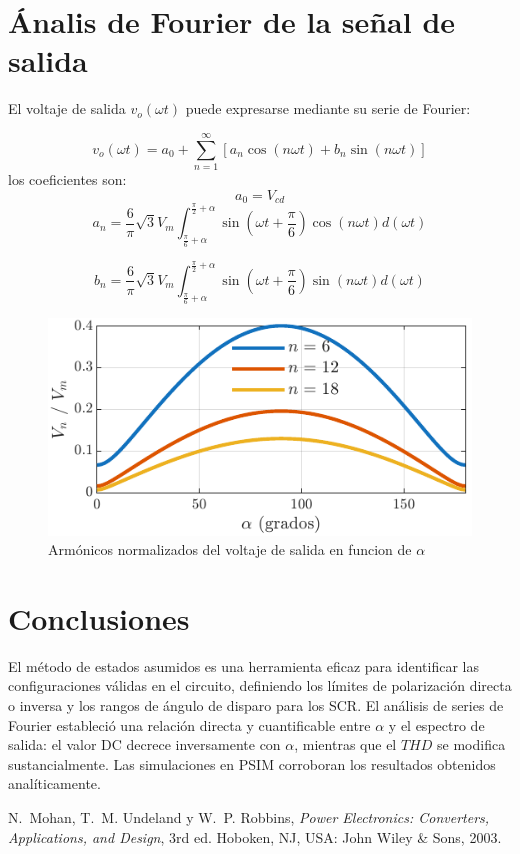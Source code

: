 \documentclass[conference]{IEEEtran}
\begin{document}
\section{Ánalis de Fourier de la señal de salida}
El voltaje de salida \(v_o(\omega t)\) puede expresarse mediante su serie de Fourier:

\[
v_o(\omega t) = a_0 + \sum_{n=1}^{\infty} \left[a_n \cos(n\omega t) + b_n \sin(n\omega t)\right]
\]
los coeficientes son:
\[
a_0 = V_{cd}
\]
\[
a_n = \frac{6}{\pi} \sqrt{3} V_m \int_{\frac{\pi}{6} + \alpha}^{\frac{\pi}{2} + \alpha} \sin\left(\omega t + \frac{\pi}{6}\right) \cos(n\omega t)  d(\omega t)
\]

\[
b_n = \frac{6}{\pi} \sqrt{3} V_m \int_{\frac{\pi}{6} + \alpha}^{\frac{\pi}{2} + \alpha} \sin\left(\omega t + \frac{\pi}{6}\right) \sin(n\omega t)  d(\omega t)
\]

\begin{figure}[ht]
	\centering
	\includegraphics[scale=1]{Fig/Armonicos.pdf}
	\caption{Armónicos normalizados del voltaje de salida en funcion de $\alpha$ }
	\label{fig:arm}
\end{figure}


\section{Conclusiones}
El método de estados asumidos es una herramienta eficaz para identificar las configuraciones válidas en el circuito, definiendo los límites de polarización directa o inversa
y los rangos de ángulo de disparo para los SCR. El análisis de series de Fourier estableció una relación directa y cuantificable entre $\alpha$ y el espectro de salida: el valor DC decrece inversamente con $\alpha$,
mientras que el $THD$ se modifica sustancialmente. Las simulaciones en PSIM corroboran los resultados obtenidos analíticamente.

\begin{thebibliography}{plain}
N.~Mohan, T.~M. Undeland y W.~P. Robbins,
\textit{Power Electronics: Converters, Applications, and Design},
3rd ed. Hoboken, NJ, USA: John Wiley \& Sons, 2003.
\end{thebibliography}
\end{document}
